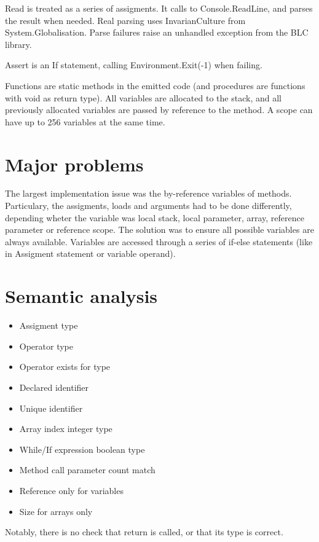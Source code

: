 \documentclass[english]{article}
\begin{document}
Read is treated as a series of assigments.
It calls to Console.ReadLine, and parses the result when needed.
Real parsing uses InvarianCulture from System.Globalisation.
Parse failures raise an unhandled exception from the BLC library.

Assert is an If statement, calling Environment.Exit(-1) when failing.

Functions are static methods in the emitted code (and procedures are functions with void as return type).
All variables are allocated to the stack, and all previously allocated variables are passed by reference to the method.
A scope can have up to 256 variables at the same time.

\section{Major problems}
The largest implementation issue was the by-reference variables of methods.
Particulary, the assigments, loads and arguments had to be done differently, depending wheter the variable was local stack, local parameter, array, reference parameter or reference scope.
The solution was to ensure all possible variables are always available.
Variables are accessed through a series of if-else statements (like in Assigment statement or variable operand).

\section{Semantic analysis}
\begin{itemize}
\item Assigment type
\item Operator type
\item Operator exists for type
\item Declared identifier
\item Unique identifier
\item Array index integer type
\item While/If expression boolean type
\item Method call parameter count match
\item Reference only for variables
\item Size for arrays only
\end{itemize}

Notably, there is no check that return is called, or that its type is correct.
\end{document}

